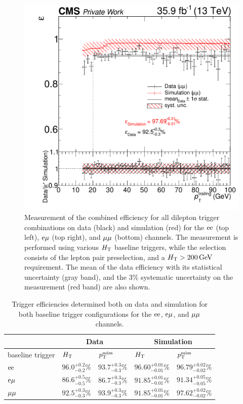 \begin{figure}[htb]
 \includegraphics[width=\pairwidth]{figures/triggerStudies/efficiency_dataHT_trigDilep_MM_pt2}
 \caption{Measurement of the combined efficiency for all dilepton trigger combinations on data (black) and simulation (red) for the $\mathrm{e}\mathrm{e}$ (top left), $\mathrm{e}\mu$ (top right), and $\mu\mu$ (bottom) channels. The measurement is performed using various $H_{\mathrm{T}}$ baseline triggers, while the selection consists of the lepton pair preselection, and a $H_{\mathrm{T}}>200\,\text{Ge\hspace{-.08em}V}$ requirement. The mean of the data efficiency with its statistical uncertainty (gray band), and the $3\%$ systematic uncertainty on the measurement (red band) are also shown.}
 \label{fig:triggEff}
\end{figure}


\begin{table}[htb]
 \centering
 \caption{Trigger efficiencies determined both on data and simulation for both baseline trigger
  configurations for the $\mathrm{e}\mathrm{e}$, $\mathrm{e}{\mu}$, and ${\mu}{\mu}$ channels.}
 \label{tab:triggEff}
 \begin{tabular}{lllll}
                   & \multicolumn{2}{c}{Data} & \multicolumn{2}{c}{Simulation}                                                         \\\hline
  baseline trigger & $H_{\mathrm{T}}$                    & $p_{\mathrm{T}}^\text{miss}$                      & $H_{\mathrm{T}}$                     & $p_{\mathrm{T}}^\text{miss}$                 \\\hline
  $\mathrm{e}\mathrm{e}$         & $96.0^{+0.2}_{-0.2}\%$   & $93.7^{+0.3}_{-0.3}\%$         & $96.60^{+0.01}_{-0.01}\%$ & $96.79^{+0.02}_{-0.02}\%$ \\
  $\mathrm{e}{\mu}$        & $86.6^{+0.5}_{-0.5}\%$   & $86.7^{+0.3}_{-0.3}\%$         & $91.85^{+0.01}_{-0.01}\%$ & $91.34^{+0.05}_{-0.05}\%$ \\
  ${\mu}{\mu}$       & $92.5^{+0.3}_{-0.3}\%$   & $93.9^{+0.3}_{-0.3}\%$         & $91.85^{+0.01}_{-0.01}\%$ & $97.62^{+0.02}_{-0.02}\%$ \\\hline
 \end{tabular}
\end{table}


